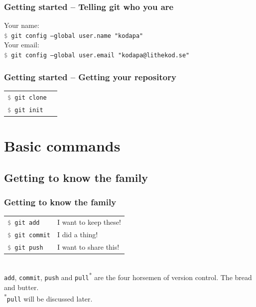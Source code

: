 \documentclass{beamer}
\newcommand{\command}[1]{\texttt{\textcolor{gray}{\$} {#1}}}
\begin{document}
\begin{frame}[fragile]
  \frametitle{Getting started -- Telling git who you are}

  Your name:\\
  \command{git config --global user.name "kodapa"} \\[1em]

  Your email:\\
  \command{git config --global user.email "kodapa@lithekod.se"} \\

\end{frame}

\begin{frame}[fragile]
  \frametitle{Getting started -- Getting your repository}
  \begin{tabular}{ll}
    \command{git clone} & \\
    \command{git init} & \\
  \end{tabular}
\end{frame}


\section{Basic commands}
\subsection{Getting to know the family}


\begin{frame}[fragile]
  \frametitle{Getting to know the family}

  \begin{tabular}{ll}
    \command{git add} & I want to keep these! \\
    \command{git commit} & I did a thing! \\
    \command{git push} & I want to share this! \\ %
  \end{tabular}
  \\ [2.0em]

  \texttt{add}, \texttt{commit}, \texttt{push} and \texttt{pull}\textsuperscript{*}
  are the four horsemen of version control. The bread and butter.
  \\ [2.0em]

  \small \textsuperscript{*}\texttt{pull} will be discussed later.

\end{frame}
\end{document}
